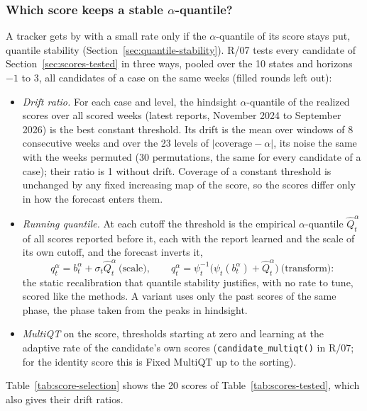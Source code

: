 \documentclass[11pt,a4paper]{article}
\theoremstyle{definition}
\theoremstyle{remark}
\begin{document}
\subsubsection{Which score keeps a stable \texorpdfstring{$\alpha$}{alpha}-quantile?}
\label{sec:score-stationarity}
\label{sec:residual-scales}
\label{sec:scale-checks}
A tracker gets by with a small rate only if the $\alpha$-quantile of its
score stays put, quantile stability (Section~\ref{sec:quantile-stability}).
R/07 tests every candidate of Section~\ref{sec:scores-tested} in three ways,
pooled over the 10 states and horizons $-1$ to $3$, all candidates of a
case on the same weeks (filled rounds left out):
\begin{itemize}[leftmargin=*,itemsep=2pt]
\item \emph{Drift ratio.} For each case and level, the hindsight
$\alpha$-quantile of the realized scores over all scored weeks (latest
reports, November 2024 to September 2026) is the best constant threshold.
Its drift is the mean over windows of 8 consecutive weeks and over the 23
levels of $|\text{coverage}-\alpha|$, its noise the same with the weeks
permuted (30 permutations, the same for every candidate of a case); their
ratio is 1 without drift. Coverage of a constant threshold
is unchanged by any fixed increasing map of the score, so the scores differ
only in how the forecast enters them.
\item \emph{Running quantile.} At each cutoff the
threshold is the empirical $\alpha$-quantile $\hat Q_{t}^\alpha$ of all
scores reported before it, each with the report learned and the scale of
its own cutoff, and the forecast inverts it,
\begin{equation}
 q_t^\alpha=b_t^\alpha+\sigma_t\hat Q_{t}^\alpha\ \text{(scale)},\qquad
 q_t^\alpha=\psi_t^{-1}\bigl(\psi_t(b_t^\alpha)+\hat Q_{t}^\alpha\bigr)\ \text{(transform)}:
 \label{eq:running-quantile}
\end{equation}
the static recalibration that quantile stability justifies, with no rate
to tune, scored like the methods. A variant uses only the past scores of
the same phase, the phase taken from the peaks in hindsight.
\item \emph{MultiQT} on the score, thresholds
starting at zero and learning at the adaptive rate of the candidate's own
scores (\texttt{candidate\_multiqt()} in R/07; for the identity score this
is Fixed MultiQT up to the sorting).
\end{itemize}
Table~\ref{tab:score-selection} shows the 20 scores of
Table~\ref{tab:scores-tested}, which also gives their drift ratios.
\end{document}
